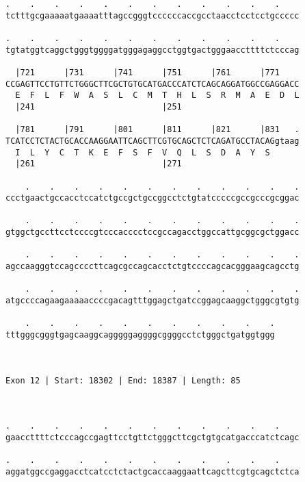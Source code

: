 \documentclass{article}
\begin{document}
\begin{Verbatim}
.    .    .    .    .    .    .    .    .    .    .    .    
tctttgcgaaaaatgaaaatttagccgggtccccccaccgcctaacctcctcctgccccc
                                                            
.    .    .    .    .    .    .    .    .    .    .    .    
tgtatggtcaggctgggtggggatgggagaggcctggtgactgggaaccttttctcccag
                                                            
  |721      |731      |741      |751      |761      |771    
CCGAGTTCCTGTTCTGGGCTTCGCTGTGCATGACCCATCTCAGCAGGATGGCCGAGGACC
  E  F  L  F  W  A  S  L  C  M  T  H  L  S  R  M  A  E  D  L
  |241                          |251                        
  
  |781      |791      |801      |811      |821      |831   .
TCATCCTCTACTGCACCAAGGAATTCAGCTTCGTGCAGCTCTCAGATGCCTACAGgtaag
  I  L  Y  C  T  K  E  F  S  F  V  Q  L  S  D  A  Y  S      
  |261                          |271                        
  
    .    .    .    .    .    .    .    .    .    .    .    .
ccctgaactgccacctccatctgccgctgccggcctctgtatcccccgccgcccgcggac
                                                            
    .    .    .    .    .    .    .    .    .    .    .    .
gtggctgccttcctccccgtcccacccctccgccagacctggccattgcggcgctggacc
                                                            
    .    .    .    .    .    .    .    .    .    .    .    .
agccaagggtccagccccttcagcgccagcacctctgtccccagcacgggaagcagcctg
                                                            
    .    .    .    .    .    .    .    .    .    .    .    .
atgccccagaagaaaaaccccgacagtttggagctgatccggagcaaggctgggcgtgtg
                                                            
    .    .    .    .    .    .    .    .    .    .    .
tttgggcgggtgagcaaggcagggggaggggcggggcctctgggctgatggtggg
                                                       
                                                       
 
Exon 12 | Start: 18302 | End: 18387 | Length: 85



.    .    .    .    .    .    .    .    .    .    .    .    
gaaccttttctcccagccgagttcctgttctgggcttcgctgtgcatgacccatctcagc
                                                            
.    .    .    .    .    .    .    .    .    .    .    .    
aggatggccgaggacctcatcctctactgcaccaaggaattcagcttcgtgcagctctca
                                                            

\end{Verbatim}
\end{document}
